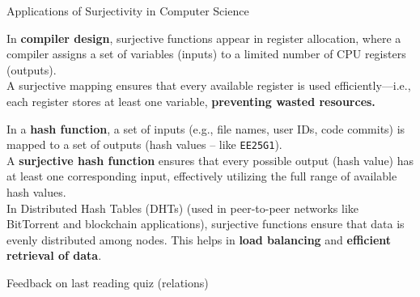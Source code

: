 \documentclass[10pt]{beamer}
\begin{document}
\begin{frame}{Applications of Surjectivity in Computer Science}
\footnotesize 

\begin{mygreenbox}[title=Application: Compiler Design and Code Optimization]
	
In \textbf{compiler design}, surjective functions appear in register allocation, where a compiler assigns a set of variables (inputs) to a limited number of CPU registers (outputs). \\

A surjective mapping ensures that every available register is used efficiently—i.e., each register stores at least one variable, \textbf{preventing wasted resources.}
\end{mygreenbox}

\vfill 
\begin{mygreenbox}[title=Application: Hash Functions]
In a \textbf{hash function}, a set of inputs (e.g., file names, user IDs, code commits) is mapped to a set of outputs (hash values -- like \texttt{EE25G1}). \\

A \textbf{surjective hash function} ensures that every possible output (hash value) has at least one corresponding input, effectively utilizing the full range of available hash values. \\

In Distributed Hash Tables (DHTs) (used in peer-to-peer networks like BitTorrent and blockchain applications), surjective functions ensure that data is evenly distributed among nodes. This helps in \textbf{load balancing} and \textbf{efficient retrieval of data}.
\end{mygreenbox}


\end{frame}


\begin{frame}[standout]
Feedback on last reading quiz (relations)
\end{frame}
\end{document}
